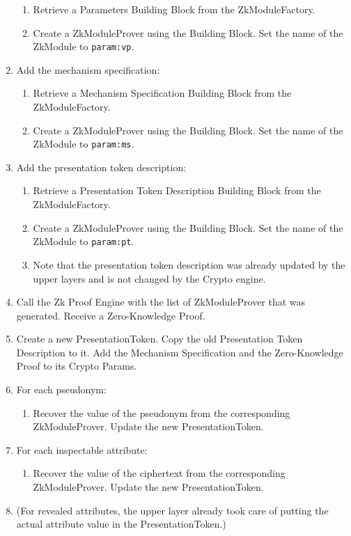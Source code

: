 \begin{enumerate}
\begin{enumerate}
          \item Retrieve a Parameters Building Block from the ZkModuleFactory.
          \item Create a ZkModuleProver using the Building Block. Set the name of the ZkModule to
            \texttt{param:vp}.
        \end{enumerate}
      \item Add the mechanism specification:
        \begin{enumerate}
          \item Retrieve a Mechanism Specification Building Block from the ZkModuleFactory.
          \item Create a ZkModuleProver using the Building Block. Set the name of the ZkModule to
            \texttt{param:ms}.
        \end{enumerate}
      \item Add the presentation token description:
        \begin{enumerate}
          \item Retrieve a Presentation Token Description Building Block from the ZkModuleFactory.
          \item Create a ZkModuleProver using the Building Block. Set the name of the ZkModule to
            \texttt{param:pt}.
          \item Note that the presentation token description was already updated by the upper layers
            and is not changed by the Crypto engine.
        \end{enumerate}
      \item Call the Zk Proof Engine with the list of ZkModuleProver that was generated. Receive
        a Zero-Knowledge Proof.
      \item Create a new PresentationToken. Copy the old Presentation Token Description to it.
        Add the Mechanism Specification and the Zero-Knowledge Proof to its Crypto Params.
      \item For each pseudonym:
        \begin{enumerate}
          \item Recover the value of the pseudonym from the corresponding ZkModuleProver. Update the new PresentationToken.
        \end{enumerate}
      \item For each inspectable attribute:
        \begin{enumerate}
          \item Recover the value of the ciphertext from the corresponding ZkModuleProver. Update the new PresentationToken.
        \end{enumerate}
      \item (For revealed attributes, the upper layer already took care of putting the actual attribute value in the PresentationToken.)
    \end{enumerate}

